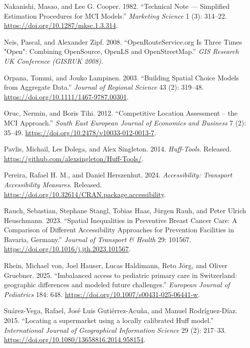 \documentclass[
]{article}
\newlength{\cslhangindent}
\newenvironment{CSLReferences}[2] %
 {\begin{list}{}{%
  \setlength{\itemindent}{0pt}
  \setlength{\leftmargin}{0pt}
  \setlength{\parsep}{0pt}
  \ifodd #1
   \setlength{\leftmargin}{\cslhangindent}
   \setlength{\itemindent}{-1\cslhangindent}
  \fi
  \setlength{\itemsep}{#2\baselineskip}}}
 {\end{list}}
\begin{document}
\begin{CSLReferences}{1}{1}
Nakanishi, Masao, and Lee G. Cooper. 1982. {``{Technical Note ---
Simplified Estimation Procedures for MCI Models}.''} \emph{Marketing
Science} 1 (3): 314--22. \url{https://doi.org/10.1287/mksc.1.3.314}.

Neis, Pascal, and Alexander Zipf. 2008. {``OpenRouteService.org Is Three
Times "Open": Combining OpenSource, OpenLS and OpenStreetMap.''}
\emph{GIS Research UK Conference (GISRUK 2008)}.

Orpana, Tommi, and Jouko Lampinen. 2003. {``Building Spatial Choice
Models from Aggregate Data.''} \emph{Journal of Regional Science} 43
(2): 319--48. \url{https://doi.org/10.1111/1467-9787.00301}.

Oruc, Nermin, and Boris Tihi. 2012. {``{Competitive Location Assessment
-- the MCI Approach}.''} \emph{South East European Journal of Economics
and Business} 7 (2): 35--49.
\url{https://doi.org/10.2478/v10033-012-0013-7}.

Pavlis, Michail, Les Dolega, and Alex Singleton. 2014.
\emph{Huff-Tools}. Released.
\url{https://github.com/alexsingleton/Huff-Tools/}.

Pereira, Rafael H. M., and Daniel Herszenhut. 2024. \emph{Accessibility:
Transport Accessibility Measures}. Released.
\url{https://doi.org/10.32614/CRAN.package.accessibility}.

Rauch, Sebastian, Stephane Stangl, Tobias Haas, Jürgen Rauh, and Peter
Ulrich Heuschmann. 2023. {``Spatial Inequalities in Preventive Breast
Cancer Care: A Comparison of Different Accessibility Approaches for
Prevention Facilities in Bavaria, Germany.''} \emph{Journal of Transport
\& Health} 29: 101567. \url{https://doi.org/10.1016/j.jth.2023.101567}.

Rhein, Michael von, Joel Hauser, Lucas Haldimann, Reto Jörg, and Oliver
Gruebner. 2025. {``{Imbalanced access to pediatric primary care in
Switzerland: geographic differences and modeled future challenges}.''}
\emph{European Journal of Pediatrics} 184: 648.
\url{https://doi.org/10.1007/s00431-025-06441-w}.

Suárez-Vega, Rafael, José Luis Gutiérrez-Acuña, and Manuel
Rodríguez-Díaz. 2015. {``{Locating a supermarket using a locally
calibrated Huff model}.''} \emph{International Journal of Geographical
Information Science} 29 (2): 217--33.
\url{https://doi.org/10.1080/13658816.2014.958154}.


\end{CSLReferences}
\end{document}
